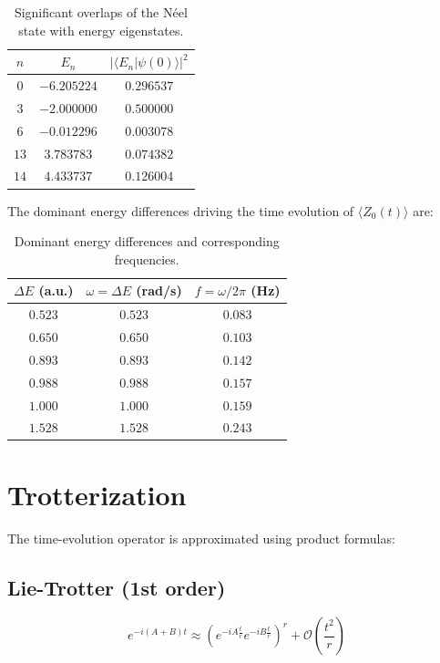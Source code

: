 \documentclass[11pt,a4paper]{article}
\begin{document}
\begin{table}[H]
\centering
\caption{Significant overlaps of the N\'eel state with energy eigenstates.}
\label{tab:overlaps}
\begin{tabular}{ccc}
\toprule
$n$ & $E_n$ & $| \langle E_n | \psi(0) \rangle |^2$ \\
\midrule
$0$ & $-6.205224$ & $0.296537$ \\
$3$ & $-2.000000$ & $0.500000$ \\
$6$ & $-0.012296$ & $0.003078$ \\
$13$ & $3.783783$ & $0.074382$ \\
$14$ & $4.433737$ & $0.126004$ \\
\bottomrule
\end{tabular}
\end{table}

The dominant energy differences driving the time evolution of $\langle Z_0(t) \rangle$ are:

\begin{table}[H]
\centering
\caption{Dominant energy differences and corresponding frequencies.}
\label{tab:energy_diffs}
\begin{tabular}{ccc}
\toprule
$\Delta E$ (a.u.) & $\omega = \Delta E$ (rad/s) & $f = \omega / 2\pi$ (Hz) \\
\midrule
$0.523$ & $0.523$ & $0.083$ \\
$0.650$ & $0.650$ & $0.103$ \\
$0.893$ & $0.893$ & $0.142$ \\
$0.988$ & $0.988$ & $0.157$ \\
$1.000$ & $1.000$ & $0.159$ \\
$1.528$ & $1.528$ & $0.243$ \\
\bottomrule
\end{tabular}
\end{table}

\section{Trotterization}

The time-evolution operator is approximated using product formulas:

\subsection{Lie-Trotter (1st order)}
\begin{equation}
    e^{-i(A+B)t} \approx \left( e^{-iA\frac{t}{r}} e^{-iB\frac{t}{r}} \right)^r + \mathcal{O}\left(\frac{t^2}{r}\right)
\end{equation}
\end{document}
